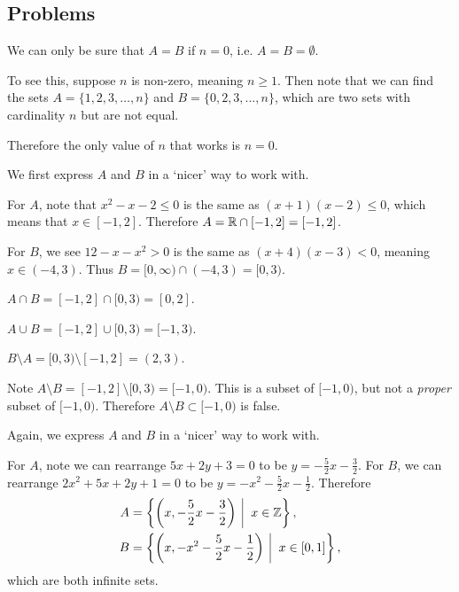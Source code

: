 \subsection*{Problems}
\begin{questions}
    \item We can only be sure that $A = B$ if $n = 0$, i.e. $A = B = \emptyset$.

    To see this, suppose $n$ is non-zero, meaning $n \geq 1$. Then note that we can find the sets $A = \{1, 2, 3, \dots, n\}$ and $B = \{0, 2, 3, \dots, n\}$, which are two sets with cardinality $n$ but are not equal.

    Therefore the only value of $n$ that works is $n = 0$.

    \item We first express $A$ and $B$ in a `nicer' way to work with.

    For $A$, note that $x^2 - x - 2 \leq 0$ is the same as $(x+1)(x-2) \leq 0$, which means that $x \in [-1, 2]$. Therefore $A = \mathbb{R} \cap [-1, 2] = [-1, 2]$.

    For $B$, we see $12 - x - x^2 > 0$ is the same as $(x+4)(x-3) < 0$, meaning $x \in (-4, 3)$. Thus $B = [0, \infty) \cap (-4, 3) = [0, 3)$.

    \begin{partquestions}{\alph*}
        \item $A \cap B = [-1, 2] \cap [0, 3) = [0, 2]$.
        \item $A \cup B = [-1, 2] \cup [0, 3) = [-1, 3)$.
        \item $B \setminus A = [0, 3) \setminus [-1, 2] = (2, 3)$.
        \item Note $A \setminus B = [-1, 2] \setminus [0, 3) = [-1, 0)$. This is a subset of $[-1, 0)$, but not a \textit{proper} subset of $[-1, 0)$. Therefore $A\setminus B \subset [-1, 0)$ is false.
    \end{partquestions}

    \item Again, we express $A$ and $B$ in a `nicer' way to work with.

    For $A$, note we can rearrange $5x+2y+3=0$ to be $y=-\frac52x-\frac32$. For $B$, we can rearrange $2x^2+5x+2y+1=0$ to be $y=-x^2-\frac52x-\frac12$. Therefore
    \begin{align*}
        A &= \left\{\left(x, -\frac52x-\frac32\right) \vert x \in \Z \right\},\\
        B &= \left\{\left(x, -x^2-\frac52x-\frac12\right) \vert x \in [0, 1] \right\},
    \end{align*}
    which are both infinite sets.


\end{questions}
